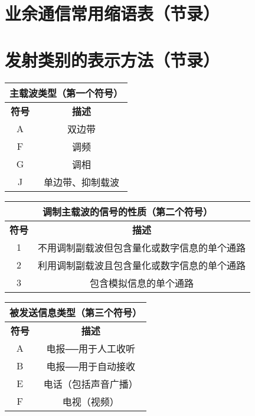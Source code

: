 \newpage



\section{业余通信常用缩语表（节录）}

\newpage

\section{发射类别的表示方法（节录）}

\begin{tabular}{|c|c|}
	\hline
	\multicolumn{2}{|c|}{\textbf{主载波类型（第一个符号）}} \\
	\hline
	\textbf{符号} & \textbf{描述} \\
	\hline
	A & 双边带 \\
	\hline
	F & 调频 \\
	\hline
	G & 调相 \\
	\hline
	J & 单边带、抑制载波 \\
	\hline
\end{tabular}

\bigskip

\begin{tabular}{|c|c|}
	\hline
	\multicolumn{2}{|c|}{\textbf{调制主载波的信号的性质（第二个符号）}} \\
	\hline
	\textbf{符号} & \textbf{描述} \\
	\hline
	1 & 不用调制副载波但包含量化或数字信息的单个通路 \\
	\hline
	2 & 利用调制副载波且包含量化或数字信息的单个通路 \\
	\hline
	3 & 包含模拟信息的单个通路 \\
	\hline
\end{tabular}

\bigskip

\begin{tabular}{|c|c|}
	\hline
	\multicolumn{2}{|c|}{\textbf{被发送信息类型（第三个符号）}} \\
	\hline
	\textbf{符号} & \textbf{描述} \\
	\hline
	A & 电报──用于人工收听 \\
	\hline
	B & 电报──用于自动接收 \\
	\hline
	E & 电话（包括声音广播） \\
	\hline
	F & 电视（视频） \\
	\hline
\end{tabular}

